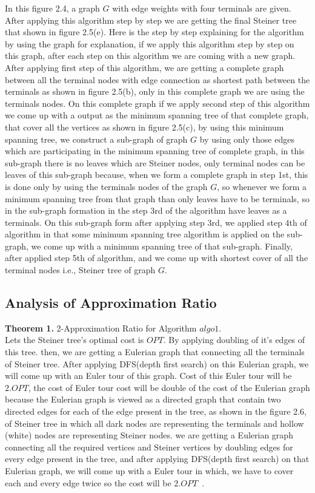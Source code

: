  In this figure 2.4, a graph $G$ with edge weights with four terminals are given. After applying this algorithm step by step we are getting the final Steiner tree that shown in figure 2.5(e). Here is the step by step explaining for the algorithm by using the graph for explanation, if we apply this algorithm step by step on this graph, after each step on this algorithm we are coming with a new graph. After applying first step of this algorithm, we are getting a complete graph between all the terminal nodes with edge connection as shortest path between the terminals as shown in figure 2.5(b), only in this complete graph we are using the terminals nodes. On this complete graph if we apply second step of this algorithm we come up with a output as the minimum spanning tree of that complete graph, that cover all the vertices as shown in figure 2.5(c), by using this minimum spanning tree, we construct a sub-graph of graph $G$ by using only those edges which are participating in the minimum spanning tree of complete graph, in this sub-graph there is no leaves which are Steiner nodes, only terminal nodes can be leaves of this sub-graph because, when we form a complete graph in step 1st, this is done only by using the terminals nodes of the graph $G$, so whenever we form a minimum spanning tree from that graph than only leaves have to be terminals, so in the sub-graph formation in the step 3rd of the algorithm have leaves as a terminals. On this sub-graph form after applying step 3rd, we applied step 4th of algorithm in that some minimum spanning tree algorithm is applied on the sub-graph, we come up with a minimum spanning tree of that sub-graph. Finally, after applied step 5th of algorithm, and we come up with shortest cover of all the terminal nodes i.e., Steiner tree of graph $G$. 


\subsection{Analysis of Approximation Ratio}

\textbf{Theorem 1.} 2-Approximation Ratio for Algorithm $algo1$.\\
Lets the Steiner tree's optimal cost is $OPT$. By applying doubling of it's edges of this tree. then, we are getting a Eulerian graph that connecting all the terminals of Steiner tree. After applying DFS(depth first search) on this Eulerian graph, we will come up with an Euler tour of this graph. Cost of this Euler tour will be $2.OPT$, the cost of Euler tour cost will be double of the cost of the Eulerian graph because the Eulerian graph is viewed as a directed graph that contain two directed edges for each of the edge present in the tree, as shown in the figure 2.6, of Steiner tree in which all dark nodes are representing the terminals and hollow (white) nodes are representing Steiner nodes. we are getting a Eulerian graph connecting all the required vertices and Steiner vertices by doubling edges for every edge present in the tree, and after applying DFS(depth first search) on that Eulerian graph, we will come up with a Euler tour in which, we have to cover each and every edge twice so the cost will be $2.OPT$~\cite{markowsky}.

